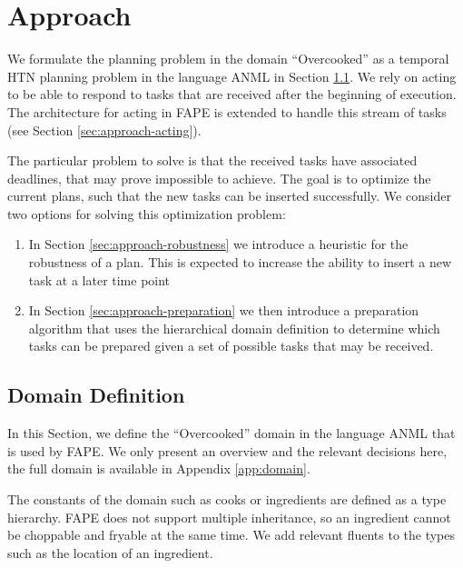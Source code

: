 \section{Approach}\label{sec:approach}


We formulate the planning problem in the domain ``Overcooked'' as a temporal HTN planning problem in the language ANML in Section \ref{sec:approach-domain}.
We rely on acting to be able to respond to tasks that are received after the beginning of execution.
The architecture for acting in FAPE \cite{bit-monnotTemporalHierarchicalModels2016a} is extended to handle this stream of tasks (see Section \ref{sec:approach-acting}).

The particular problem to solve is that the received tasks have associated deadlines, that may prove impossible to achieve.
The goal is to optimize the current plans, such that the new tasks can be inserted successfully.
We consider two options for solving this optimization problem:

\begin{enumerate}
    \item In Section \ref{sec:approach-robustness} we introduce a heuristic for the robustness of a plan. This is expected to increase the ability to insert a new task at a later time point
    \item In Section \ref{sec:approach-preparation} we then introduce a preparation algorithm that uses the hierarchical domain definition to determine which tasks can be prepared given a set of possible tasks that may be received.
\end{enumerate}

\subsection{Domain Definition}
\label{sec:approach-domain}

In this Section, we define the ``Overcooked'' domain in the language ANML \cite{smithANMLLanguage2008} that is used by FAPE.
We only present an overview and the relevant decisions here, the full domain is available in Appendix \ref{app:domain}.

The constants of the domain such as cooks or ingredients are defined as a type hierarchy.
FAPE does not support multiple inheritance, so an ingredient cannot be choppable and fryable at the same time.
We add relevant fluents to the types such as the location of an ingredient.

